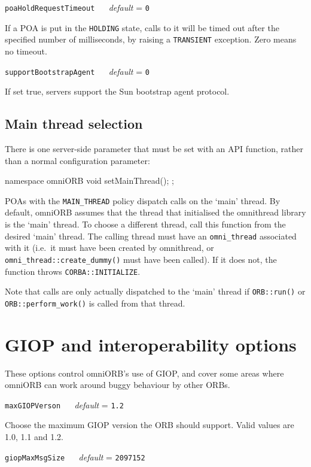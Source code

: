 \documentclass[11pt,twoside,a4paper]{book}
\makeatletter
\newcommand{\code}[1]{\texttt{#1}}
\newcommand{\op}[1]{\texttt{#1()}}
\newcommand{\confopt}[2]
  {\vspace{\baselineskip}\par\noindent\code{#1} ~~ \textit{default} =
   \code{#2}\\[-1ex]\@afterheading}
\newcommand{\dsc}{\discretionary{}{}{}}
\makeatother
\begin{document}
\confopt{poaHoldRequestTimeout}{0}

If a POA is put in the \code{HOLDING} state, calls to it will be timed
out after the specified number of milliseconds, by raising a
\code{TRANSIENT} exception. Zero means no timeout.


\confopt{supportBootstrapAgent}{0}

If set true, servers support the Sun bootstrap agent protocol.


\subsection{Main thread selection}

There is one server-side parameter that must be set with an API
function, rather than a normal configuration parameter:

\begin{cxxlisting}
namespace omniORB {
  void setMainThread();
};
\end{cxxlisting}

\noindent
POAs with the \code{MAIN\_THREAD} policy dispatch calls on the `main'
thread.  By default, omniORB assumes that the thread that initialised
the omnithread library is the `main' thread. To choose a different
thread, call this function from the desired `main' thread. The calling
thread must have an \code{omni\_thread} associated with it (i.e.\ it
must have been created by omnithread, or
\op{omni\_thread::create\_\dsc{}dummy} must have been called). If it
does not, the function throws \code{CORBA::\dsc{}INITIALIZE}.
                                                                  
Note that calls are only actually dispatched to the `main' thread if
\op{ORB::run} or \op{ORB::perform\_work} is called from that thread.




\section{GIOP and interoperability options}

These options control omniORB's use of GIOP, and cover some areas
where omniORB can work around buggy behaviour by other ORBs.


\confopt{maxGIOPVerson}{1.2}

Choose the maximum GIOP version the ORB should support. Valid values
are 1.0, 1.1 and 1.2.


\confopt{giopMaxMsgSize}{2097152}
\end{document}
